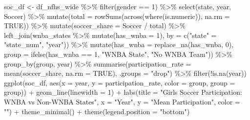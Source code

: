 \documentclass[
  letterpaper,
  DIV=11,
  numbers=noendperiod]{scrartcl}
\newenvironment{Shaded}{\begin{snugshade}}{\end{snugshade}}
\newcommand{\AttributeTok}[1]{\textcolor[rgb]{0.40,0.45,0.13}{#1}}
\newcommand{\ConstantTok}[1]{\textcolor[rgb]{0.56,0.35,0.01}{#1}}
\newcommand{\DecValTok}[1]{\textcolor[rgb]{0.68,0.00,0.00}{#1}}
\newcommand{\FunctionTok}[1]{\textcolor[rgb]{0.28,0.35,0.67}{#1}}
\newcommand{\NormalTok}[1]{\textcolor[rgb]{0.00,0.23,0.31}{#1}}
\newcommand{\OtherTok}[1]{\textcolor[rgb]{0.00,0.23,0.31}{#1}}
\newcommand{\SpecialCharTok}[1]{\textcolor[rgb]{0.37,0.37,0.37}{#1}}
\newcommand{\StringTok}[1]{\textcolor[rgb]{0.13,0.47,0.30}{#1}}
\begin{document}
\begin{Shaded}
\begin{Highlighting}[]
\NormalTok{soc\_df }\OtherTok{\textless{}{-}}\NormalTok{ df\_nfhs\_wide }\SpecialCharTok{\%\textgreater{}\%}
  \FunctionTok{filter}\NormalTok{(gender }\SpecialCharTok{==} \DecValTok{1}\NormalTok{) }\SpecialCharTok{\%\textgreater{}\%}
  \FunctionTok{select}\NormalTok{(state, year, Soccer) }\SpecialCharTok{\%\textgreater{}\%}
  \FunctionTok{mutate}\NormalTok{(}\AttributeTok{total =} \FunctionTok{rowSums}\NormalTok{(}\FunctionTok{across}\NormalTok{(}\FunctionTok{where}\NormalTok{(is.numeric)), }\AttributeTok{na.rm =} \ConstantTok{TRUE}\NormalTok{)) }\SpecialCharTok{\%\textgreater{}\%}
  \FunctionTok{mutate}\NormalTok{(}\AttributeTok{soccer\_share =}\NormalTok{ Soccer }\SpecialCharTok{/}\NormalTok{ total) }\SpecialCharTok{\%\textgreater{}\%}
  \FunctionTok{left\_join}\NormalTok{(wnba\_states }\SpecialCharTok{\%\textgreater{}\%} \FunctionTok{mutate}\NormalTok{(}\AttributeTok{has\_wnba =} \DecValTok{1}\NormalTok{), }
            \AttributeTok{by =} \FunctionTok{c}\NormalTok{(}\StringTok{"state"} \OtherTok{=} \StringTok{"state\_num"}\NormalTok{, }\StringTok{"year"}\NormalTok{)) }\SpecialCharTok{\%\textgreater{}\%}
  \FunctionTok{mutate}\NormalTok{(}\AttributeTok{has\_wnba =} \FunctionTok{replace\_na}\NormalTok{(has\_wnba, }\DecValTok{0}\NormalTok{),}
         \AttributeTok{group =} \FunctionTok{ifelse}\NormalTok{(has\_wnba }\SpecialCharTok{==} \DecValTok{1}\NormalTok{, }\StringTok{"WNBA State"}\NormalTok{, }\StringTok{"No WNBA Team"}\NormalTok{)) }\SpecialCharTok{\%\textgreater{}\%}
  \FunctionTok{group\_by}\NormalTok{(group, year) }\SpecialCharTok{\%\textgreater{}\%}
  \FunctionTok{summarise}\NormalTok{(}\AttributeTok{participation\_rate =} \FunctionTok{mean}\NormalTok{(}\StringTok{\textasciigrave{}}\AttributeTok{soccer\_share}\StringTok{\textasciigrave{}}\NormalTok{, }\AttributeTok{na.rm =} \ConstantTok{TRUE}\NormalTok{), }\AttributeTok{.groups =} \StringTok{"drop"}\NormalTok{) }\SpecialCharTok{\%\textgreater{}\%}
  \FunctionTok{filter}\NormalTok{(}\SpecialCharTok{!}\FunctionTok{is.na}\NormalTok{(year)) }
\FunctionTok{ggplot}\NormalTok{(soc\_df, }\FunctionTok{aes}\NormalTok{(}\AttributeTok{x =}\NormalTok{ year, }\AttributeTok{y =}\NormalTok{ participation\_rate, }\AttributeTok{color =}\NormalTok{ group, }\AttributeTok{group =}\NormalTok{ group)) }\SpecialCharTok{+}
  \FunctionTok{geom\_line}\NormalTok{(}\AttributeTok{linewidth =} \DecValTok{1}\NormalTok{) }\SpecialCharTok{+}
  \FunctionTok{labs}\NormalTok{(}\AttributeTok{title =} \StringTok{"Girls Soccer Participation: WNBA vs Non{-}WNBA States"}\NormalTok{,}
       \AttributeTok{x =} \StringTok{"Year"}\NormalTok{, }\AttributeTok{y =} \StringTok{"Mean Participation"}\NormalTok{, }\AttributeTok{color =} \StringTok{""}\NormalTok{) }\SpecialCharTok{+}
  \FunctionTok{theme\_minimal}\NormalTok{() }\SpecialCharTok{+}
  \FunctionTok{theme}\NormalTok{(}\AttributeTok{legend.position =} \StringTok{"bottom"}\NormalTok{)}
\end{Highlighting}
\end{Shaded}
\end{document}
